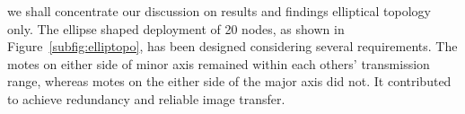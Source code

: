 \documentclass[conference,final]{IEEEtran}
\newcommand{\notedme}[1]{\raisebox{0pt}[0pt][0pt]{\pdfcomment[open=true,color=blue]{#1}}}
\begin{document}

we shall concentrate our discussion on results and findings elliptical topology only.
The ellipse shaped deployment of 20 nodes, as shown in Figure~\ref{subfig:elliptopo}, has been designed considering several requirements.
The motes on either side of minor axis remained within each others' transmission range, whereas motes on the either side of the major axis did not.
It contributed to achieve  redundancy and  reliable image transfer. 
\end{document}
